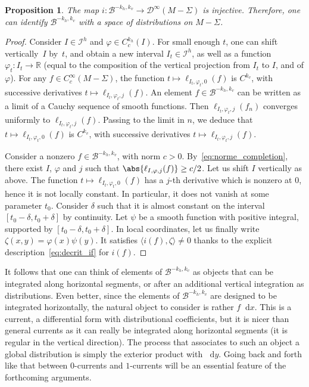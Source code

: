 \documentclass[JEP,XML,SOM,Unicode]{cedram}
\newcommand{\boI}{\mathcal{I}}
\newcommand{\boB}{\mathcal{B}}
\newcommand{\boD}{\mathcal{D}}
\newcommand{\R}{\mathbb{R}}
\newcommand{\dd}{\mathop{}\!\mathrm{d}}
\let\phi\varphi
\newtheorem{prop}[thm]{Proposition}
\theoremstyle{definition}
\numberwithin{equation}{section}
\begin{document}
\begin{prop}
\label{prop:distrib} The map $i: \boB^{-k_h, k_v} \to \boD^\infty(M-\Sigma)$
is injective. Therefore, one can identify $\boB^{-k_h, k_v}$ with a space of
distributions on $M-\Sigma$.
\end{prop}
\begin{proof}
Consider $I \in \boI^h$ and $\phi \in C^{k_h}_c(I)$. For small enough $t$,
one can shift vertically~$I$ by~$t$, and obtain a new interval $I_t \in
\boI^h$, as well as a function $\phi_t:I_t \to \R$ (equal to the composition
of the vertical projection from $I_t$ to $I$, and of $\phi$). For any $f \in
C^\infty_c(M-\Sigma)$, the function $t \mapsto \ell_{I_t, \phi_t, 0}(f)$ is
$C^{k_v}$, with successive derivatives $t \mapsto \ell_{I_t, \phi_t, j}(f)$.
An element $f \in \boB^{-k_h, k_v}$ can be written as a limit of a Cauchy
sequence of smooth functions. Then $\ell_{I_t, \phi_t, j}(f_n)$ converges
uniformly to $\ell_{I_t, \phi_t, j}(f)$. Passing to the limit in $n$, we
deduce that $t \mapsto \ell_{I_t, \phi_t, 0}(f)$ is $C^{k_v}$, with
successive derivatives $t \mapsto \ell_{I_t, \phi_t, j}(f)$.

Consider a nonzero $f \in \boB^{-k_h, k_v}$, with norm $c>0$.
By~\eqref{eq:norme_completion}, there exist $I$, $\phi$ and $j$ such that
$\abs{\ell_{I,\phi,j}(f)} \geq c/2$. Let us shift $I$ vertically as above.
The function $t \mapsto \ell_{I_t, \phi_t, 0}(f)$ has a $j$-th derivative
which is nonzero at $0$, hence it is not locally constant. In particular, it
does not vanish at some parameter $t_0$. Consider $\delta$ such that it is
almost constant on the interval $[t_0-\delta, t_0+\delta]$ by continuity. Let
$\psi$ be a smooth function with positive integral, supported by
$[t_0-\delta, t_0+\delta]$. In local coordinates, let us finally write
$\zeta(x,y)= \phi(x) \psi(y)$. It satisfies $\langle i(f), \zeta \rangle \neq
0$ thanks to the explicit description~\eqref{eq:decrit_if} for $i(f)$.
\end{proof}

It follows that one can think of elements of $\boB^{-k_h, k_v}$ as objects
that can be integrated along horizontal segments, or after an additional
vertical integration as distributions. Even better, since the elements of
$\boB^{-k_h, k_v}$ are designed to be integrated horizontally, the natural
object to consider is rather $f\dd x$. This is a current, \ie a
differential form with distributional coefficients, but it is nicer than
general currents as it can really be integrated along horizontal segments
(\ie it is regular in the vertical direction). The process that associates
to such an object a global distribution is simply the exterior product with
$\dd y$. Going back and forth like that between $0$-currents and $1$-currents
will be an essential feature of the forthcoming arguments.
\end{document}
